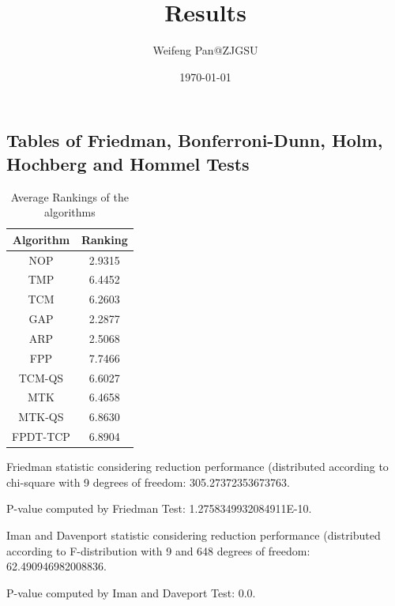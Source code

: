 \documentclass[a4paper,10pt]{article}
\title{Results}
\author{Weifeng Pan@ZJGSU}
\date{\today}
\begin{document}
\begin{landscape}
\oddsidemargin 0in \topmargin 0in\maketitle
\section{Tables of Friedman, Bonferroni-Dunn, Holm, Hochberg and Hommel Tests}
\begin{table}[!htp]
\centering
\caption{Average Rankings of the algorithms
}\begin{tabular}{c|c}
Algorithm&Ranking\\
\hline
NOP&2.9315\\
TMP&6.4452\\
TCM&6.2603\\
GAP&2.2877\\
ARP&2.5068\\
FPP&7.7466\\
TCM-QS&6.6027\\
MTK&6.4658\\
MTK-QS&6.8630\\
FPDT-TCP&6.8904\\
\end{tabular}
\end{table}


Friedman statistic considering reduction performance (distributed according to chi-square with 9 degrees of freedom: 305.27372353673763.


P-value computed by Friedman Test: 1.2758349932084911E-10.\newline

Iman and Davenport statistic considering reduction performance (distributed according to F-distribution with 9 and 648 degrees of freedom: 62.490946982008836.


P-value computed by Iman and Daveport Test: 0.0.\newline


\end{landscape}
\end{document}
